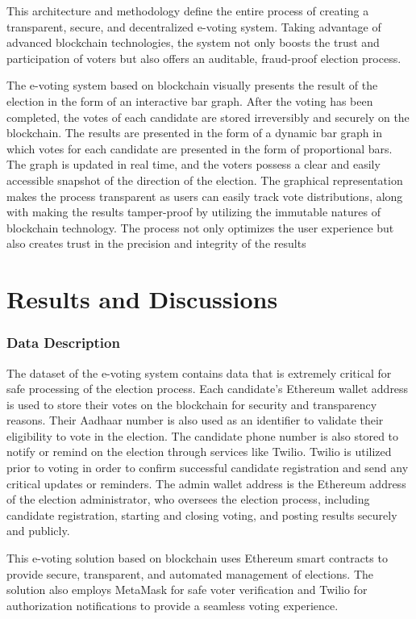 \documentclass[conference]{IEEEtran}
\begin{document}
This architecture and methodology define the entire process of creating a transparent, secure, and decentralized e-voting system. Taking advantage of advanced blockchain technologies, the system not only boosts the trust and participation of voters but also offers an auditable, fraud-proof election process.

The e-voting system based on blockchain visually presents the result of the election in the form of an interactive bar graph. After the voting has been completed, the votes of each candidate are stored irreversibly and securely on the blockchain. The results are presented in the form of a dynamic bar graph in which votes for each candidate are presented in the form of proportional bars. The graph is updated in real time, and the voters possess a clear and easily accessible snapshot of the direction of the election. The graphical representation makes the process transparent as users can easily track vote distributions, along with making the results tamper-proof by utilizing the immutable natures of blockchain technology. The process not only optimizes the user experience but also creates trust in the precision and integrity of the results

\section{Results and Discussions}




\subsubsection{Data Description}
The dataset of the e-voting system contains data that is extremely critical for safe processing of the election process. Each candidate's Ethereum wallet address is used to store their votes on the blockchain for security and transparency reasons. Their Aadhaar number is also used as an identifier to validate their eligibility to vote in the election.
The candidate phone number is also stored to notify or remind on the election through services like Twilio. Twilio is utilized prior to voting in order to confirm successful candidate registration and send any critical updates or reminders. The admin wallet address is the Ethereum address of the election administrator, who oversees the election process, including candidate registration, starting and closing voting, and posting results securely and publicly.

This e-voting solution based on blockchain uses Ethereum smart contracts to provide secure, transparent, and automated management of elections. The solution also employs MetaMask for safe voter verification and Twilio for authorization notifications to provide a seamless voting experience.
\end{document}
